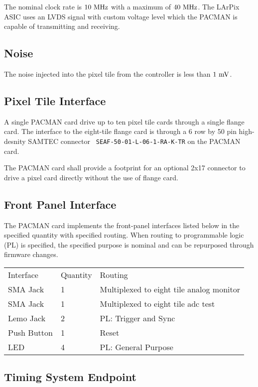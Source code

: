 \documentclass[12pt]{article}
\begin{document}
The nominal clock rate is $10~\rm MHz$ with a maximum of $40~\rm MHz$.
The LArPix ASIC uses an LVDS signal with custom voltage level which
the PACMAN is capable of transmitting and receiving.

\subsection{Noise}

The noise injected into the pixel tile from the controller is less than $1~\rm mV$.

\subsection{Pixel Tile Interface}

A single PACMAN card drive up to ten pixel tile cards through a single
flange card.  The interface to the eight-tile flange card is through a
6 row by 50 pin high-desnity SAMTEC connector {\tt
  SEAF-50-01-L-06-1-RA-K-TR} on the PACMAN card.

The PACMAN card shall provide a footprint for an optional 2x17
connector to drive a pixel card directly without the use of flange
card.

\subsection{Front Panel Interface}

The PACMAN card implements the front-panel interfaces listed below in
the specified quantity with specified routing.  When routing to
programmable logic (PL) is specified, the specified purpose is nominal
and can be repurposed through firmware changes.

\begin{center}
\begin{tabular}{lll}
Interface   & Quantity & Routing \\
SMA Jack    & 1 & Multiplexed to eight tile analog monitor \\
SMA Jack    & 1 & Multiplexed to eight tile adc test \\
Lemo Jack   & 2 & PL: Trigger and Sync \\
Push Button & 1 & Reset \\
LED         & 4 & PL: General Purpose
\end{tabular}
\end{center}


\subsection{Timing System Endpoint}
\end{document}
